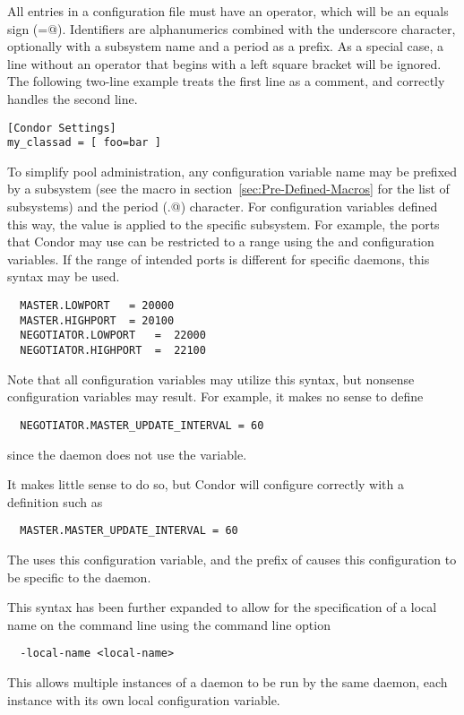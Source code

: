 All entries in a configuration file must have an operator,
which will be an equals sign (\verb@=@).
Identifiers are alphanumerics combined with the underscore character,
optionally with a subsystem name and a period as a prefix.
As a special case,
a line without an operator that begins with a left square bracket
will be ignored.
The following two-line example treats the first line as a comment,
and correctly handles the second line.
\begin{verbatim}
[Condor Settings]
my_classad = [ foo=bar ]
\end{verbatim}

To simplify pool administration,
any configuration variable name may be prefixed by
a subsystem 
(see the  macro in 
section~\ref{sec:Pre-Defined-Macros}
for the list of subsystems)
and the period (\verb@.@) character.
For configuration variables defined this way,
the value is applied to the specific subsystem.
For example,
the ports that Condor may use can be restricted to a range 
using the  and  configuration
variables.
If the range of intended ports is different for specific
daemons, this syntax may be used.

\begin{verbatim}
  MASTER.LOWPORT   = 20000
  MASTER.HIGHPORT  = 20100
  NEGOTIATOR.LOWPORT   =  22000 
  NEGOTIATOR.HIGHPORT  =  22100
\end{verbatim}

Note that all configuration variables may utilize this syntax,
but nonsense configuration variables may result.
For example, it makes no sense to define
\begin{verbatim}
  NEGOTIATOR.MASTER_UPDATE_INTERVAL = 60
\end{verbatim}
since the  daemon does not use the
 variable.

It makes little sense to do so, but Condor will configure
correctly with a definition such as
\begin{verbatim}
  MASTER.MASTER_UPDATE_INTERVAL = 60
\end{verbatim}
The  uses this configuration variable,
and the prefix of  causes this configuration
to be specific to the  daemon.

This syntax has been further expanded to allow for the
specification of a local name on the command line 
using the command line option
\begin{verbatim}
  -local-name <local-name>
\end{verbatim}
This allows multiple instances of a daemon to be run 
by the same  daemon,
each instance with its own local configuration variable.

